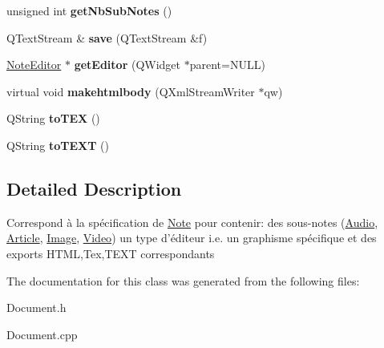 \begin{DoxyCompactItemize}
\item 
\hypertarget{classDocument_ae61276d28ebbc3ceb5f91907e226868f}{unsigned int {\bfseries get\-Nb\-Sub\-Notes} ()}\label{classDocument_ae61276d28ebbc3ceb5f91907e226868f}

\item 
\hypertarget{classDocument_afeeecb69d4ed6095ffd0b06881d6417c}{\-Q\-Text\-Stream \& {\bfseries save} (\-Q\-Text\-Stream \&f)}\label{classDocument_afeeecb69d4ed6095ffd0b06881d6417c}

\item 
\hypertarget{classDocument_a3fbc8eb1a50ec40c7cd74e5a969921a6}{\hyperlink{classNoteEditor}{\-Note\-Editor} $\ast$ {\bfseries get\-Editor} (\-Q\-Widget $\ast$parent=\-N\-U\-L\-L)}\label{classDocument_a3fbc8eb1a50ec40c7cd74e5a969921a6}

\item 
\hypertarget{classDocument_aeca93d0a046ccf87ff54daa56ea4fbcc}{virtual void {\bfseries makehtmlbody} (\-Q\-Xml\-Stream\-Writer $\ast$qw)}\label{classDocument_aeca93d0a046ccf87ff54daa56ea4fbcc}

\item 
\hypertarget{classDocument_abfe8c70f4db8563d41b1fed8ddbe268c}{\-Q\-String {\bfseries to\-T\-E\-X} ()}\label{classDocument_abfe8c70f4db8563d41b1fed8ddbe268c}

\item 
\hypertarget{classDocument_a47012344c13c7b6f43cce93d23e5f636}{\-Q\-String {\bfseries to\-T\-E\-X\-T} ()}\label{classDocument_a47012344c13c7b6f43cce93d23e5f636}

\end{DoxyCompactItemize}


\subsection{\-Detailed \-Description}
\-Correspond à la spécification de \hyperlink{classNote}{\-Note} pour contenir\-: des sous-\/notes (\hyperlink{classAudio}{\-Audio}, \hyperlink{classArticle}{\-Article}, \hyperlink{classImage}{\-Image}, \hyperlink{classVideo}{\-Video}) un type d'éditeur i.\-e. un graphisme spécifique et des exports \-H\-T\-M\-L,\-Tex,\-T\-E\-X\-T correspondants 

\-The documentation for this class was generated from the following files\-:\begin{DoxyCompactItemize}
\item 
\-Document.\-h\item 
\-Document.\-cpp\end{DoxyCompactItemize}
